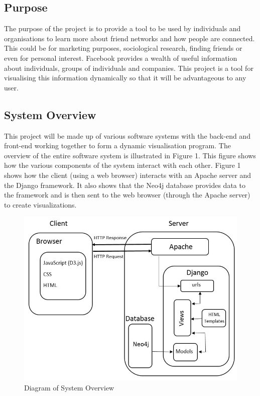 \documentclass[10pt,onecolumn]{article}
\begin{document}
\subsection{Purpose}
The purpose of the project is to provide a tool to be used  by individuals and organisations to learn more about friend networks and how people are connected. This could be for marketing purposes, sociological research, finding friends or even for personal  interest. Facebook provides a wealth of useful information about individuals, groups of individuals and companies. This project is a tool for visualising this information dynamically so that it will be advantageous to any  user.

\subsection{System Overview}
This project will be made up of various software systems with the back-end and front-end working together to form a dynamic visualisation program. The overview of the entire software system is illustrated in Figure 1. This figure shows how the various components of the system interact with each other. Figure 1 shows how the client (using a web browser) interacts with an Apache server and the Django framework. It also shows that the Neo4j database provides data to the framework and is then sent to the web browser (through the Apache server) to create visualizations.

\begin{figure}[h]
	\centering
	\includegraphics[scale=0.65]{system}
	\caption{Diagram of System Overview}
	\label{system}
\end{figure}
\end{document}
